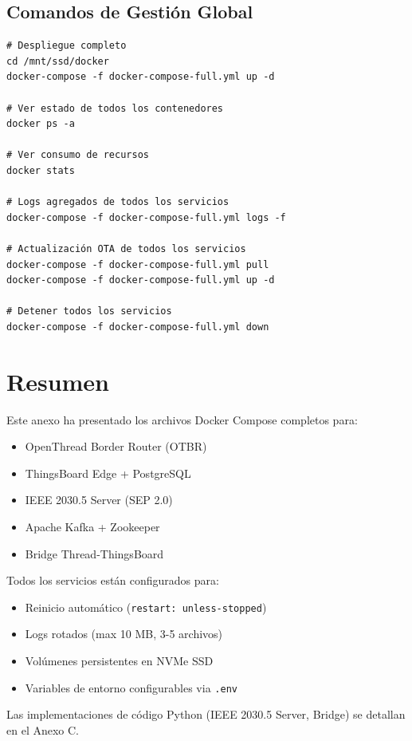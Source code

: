 \subsection{Comandos de Gestión Global}

\begin{verbatim}
# Despliegue completo
cd /mnt/ssd/docker
docker-compose -f docker-compose-full.yml up -d

# Ver estado de todos los contenedores
docker ps -a

# Ver consumo de recursos
docker stats

# Logs agregados de todos los servicios
docker-compose -f docker-compose-full.yml logs -f

# Actualización OTA de todos los servicios
docker-compose -f docker-compose-full.yml pull
docker-compose -f docker-compose-full.yml up -d

# Detener todos los servicios
docker-compose -f docker-compose-full.yml down
\end{verbatim}

\section{Resumen}

Este anexo ha presentado los archivos Docker Compose completos para:

\begin{itemize}
    \item OpenThread Border Router (OTBR)
    \item ThingsBoard Edge + PostgreSQL
    \item IEEE 2030.5 Server (SEP 2.0)
    \item Apache Kafka + Zookeeper
    \item Bridge Thread-ThingsBoard
\end{itemize}

Todos los servicios están configurados para:
\begin{itemize}
    \item Reinicio automático (\texttt{restart: unless-stopped})
    \item Logs rotados (max 10 MB, 3-5 archivos)
    \item Volúmenes persistentes en NVMe SSD
    \item Variables de entorno configurables via \texttt{.env}
\end{itemize}

Las implementaciones de código Python (IEEE 2030.5 Server, Bridge) se detallan en el Anexo C.

